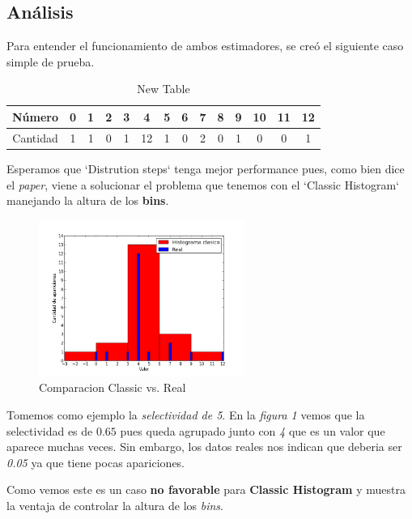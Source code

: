 \documentclass[10pt, a4paper,english,spanish,hidelinks]{article}
\begin{document}
\subsection{Análisis}

Para entender el funcionamiento de ambos estimadores, se creó el siguiente caso simple de prueba.

\begin{table}[htdp]
  \begin{center}
    \begin{tabular}{|c|c|c|c|c|c|c|c|c|c|c|c|c|c|} \hline
       Número  & 0 & 1 & 2 & 3 & 4 & 5 & 6 & 7 & 8 & 9 & 10 & 11 & 12 \\ \hline
       Cantidad & 1 & 1 & 0 & 1 & 12 & 1 & 0 & 2 & 0 & 1 & 0 & 0 & 1 \\ \hline
    \end{tabular}
  \end{center}
  \caption{New Table}
  \label{tab:newTable}
\end{table}


Esperamos que `Distrution steps` tenga mejor performance pues, como bien dice el \textit{paper},
viene a solucionar el problema que tenemos con el `Classic Histogram` manejando la altura
de los \textbf{bins}.

\begin{figure}[h!]
  \centering
  \includegraphics[width=0.6\textwidth]{./imagenes/ejb1_ejemplo_classic_y_real.png}
  \caption{Comparacion Classic vs. Real}
\end{figure}


Tomemos como ejemplo la \textit{selectividad de 5}.
En la \textit{figura 1} vemos que la selectividad es de $0.65$ pues queda agrupado junto
con \textit{4} que es un valor que aparece muchas veces. Sin embargo, los datos reales nos
indican que deberia ser \textit{0.05} ya que tiene pocas apariciones.

Como vemos este es un caso \textbf{no favorable} para \textbf{Classic Histogram} y
muestra la ventaja de controlar la altura de los \textit{bins}.
\end{document}
